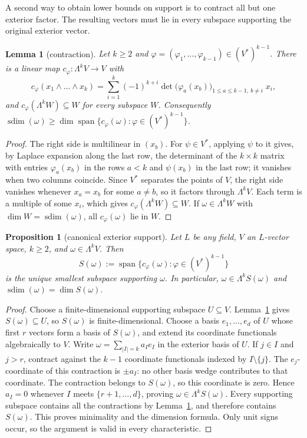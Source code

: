\documentclass[11pt]{amsart}
\newtheorem{lemma}[theorem]{Lemma}
\newtheorem{proposition}[theorem]{Proposition}
\theoremstyle{definition}
\theoremstyle{remark}
\numberwithin{equation}{section}
\newcommand{\spn}{\operatorname{span}}
\newcommand{\sdim}{\operatorname{sdim}}
\theoremstyle{plain}
\theoremstyle{definition}
\theoremstyle{plain}
\begin{document}
A second way to obtain lower bounds on support is to contract all but one exterior factor. The resulting vectors
must lie in every subspace supporting the original exterior vector.

\begin{samepage}
\begin{lemma}[contraction]\label{lem:contr}
Let $k\ge2$ and $\varphi=(\varphi_1,\dots,\varphi_{k-1})\in(V^*)^{k-1}$. There is a linear map $c_\varphi\colon\Lambda^kV\to V$
with
\[
c_\varphi(x_1\wedge\dots\wedge x_k)=\sum_{i=1}^k(-1)^{k+i}\det\bigl(\varphi_a(x_b)\bigr)_{1\le a\le k-1,\ b\ne i}\;x_i ,
\]
and $c_\varphi(\Lambda^kW)\subseteq W$ for every subspace $W$. Consequently
$\sdim(\omega)\ge\dim\spn\{c_\varphi(\omega):\varphi\in(V^*)^{k-1}\}$.
\end{lemma}
\end{samepage}

\begin{proof}
The right side is multilinear in $(x_b)$. For $\psi\in V^*$, applying $\psi$ to it gives, by Laplace expansion along the
last row, the determinant of the $k\times k$ matrix with entries $\varphi_a(x_b)$ in the rows $a<k$ and $\psi(x_b)$ in the last
row; it vanishes when two columns coincide. Since $V^*$ separates the points of $V$, the right side
vanishes whenever $x_a=x_b$ for some $a\ne b$, so it factors through $\Lambda^kV$. Each term is a multiple of some $x_i$, which gives
$c_\varphi(\Lambda^kW)\subseteq W$. If $\omega\in\Lambda^kW$ with $\dim W=\sdim(\omega)$, all $c_\varphi(\omega)$ lie in $W$.
\end{proof}

\begin{proposition}[canonical exterior support]\label{prop:canonical-support}
Let $L$ be any field, $V$ an $L$\nobreakdash-vector space, $k\ge2$, and
$\omega\in\Lambda^kV$. Then
\[
S(\omega):=\spn\{c_\varphi(\omega):\varphi\in(V^*)^{k-1}\}
\]
is the unique smallest subspace supporting $\omega$. In particular,
$\omega\in\Lambda^k S(\omega)$ and
$\sdim(\omega)=\dim S(\omega)$.
\end{proposition}

\begin{proof}
Choose a finite-dimensional supporting subspace $U\subseteq V$.
Lemma~\ref{lem:contr} gives $S(\omega)\subseteq U$, so $S(\omega)$ is
finite-dimensional. Choose a basis $e_1,\dots,e_d$ of $U$ whose first
$r$ vectors form a basis of $S(\omega)$, and extend its coordinate
functionals algebraically to $V$. Write
$\omega=\sum_{|I|=k}a_Ie_I$ in the exterior basis of $U$.
If $j\in I$ and $j>r$, contract against the $k-1$ coordinate functionals
indexed by $I\setminus\{j\}$. The $e_j$\nobreakdash-coordinate of this
contraction is $\pm a_I$: no other basis wedge contributes to that
coordinate. The contraction belongs to $S(\omega)$, so this coordinate
is zero. Hence $a_I=0$ whenever $I$ meets $\{r+1,\dots,d\}$, proving
$\omega\in\Lambda^k S(\omega)$.
Every supporting subspace contains all the contractions by
Lemma~\ref{lem:contr}, and therefore contains $S(\omega)$. This proves
minimality and the dimension formula. Only unit signs occur, so the
argument is valid in every characteristic.
\end{proof}
\end{document}
